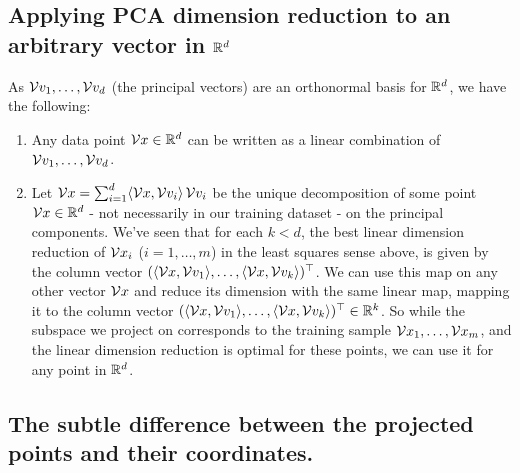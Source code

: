 \subsection{Applying PCA dimension reduction to an arbitrary vector in $\mathbb{R}^d$}
As $\mathcal{V}{v}_1,\ldots, \mathcal{V}{v}_d$  (the principal vectors) are an orthonormal basis
for $\mathbb{R}^d$, we have the following:
\begin{enumerate}
  \item Any data point $\mathcal{V}{x}\in\mathbb{R}^d$ can be written as a linear 
    combination of  $\mathcal{V}{v}_1,\ldots, \mathcal{V}{v}_d$. 
  \item Let $\mathcal{V}{x}=\sum_{i=1}^d \langle \mathcal{V}{x},\mathcal{V}{v}_i \rangle\, \mathcal{V}{v}_i$ be the unique decomposition
    of some point
    $\mathcal{V}{x}\in\mathbb{R}^d$ - not necessarily in our training 
    dataset -  on the principal components. 
    We've seen that for each $k<d$, the best linear dimension reduction of
    $\mathcal{V}{x}_i$ ($i=1,\ldots, m$) in the least squares sense above, is 
    given by the column vector $(\langle \mathcal{V}{x},\mathcal{V}{v}_1 \rangle,
    \ldots,
  \langle \mathcal{V}{x},\mathcal{V}{v}_k \rangle)^\top$. 
    We can use this map on any other vector $\mathcal{V}{x}$ and reduce its dimension
    with the same linear map, mapping it to 
    the column vector $(\langle \mathcal{V}{x},\mathcal{V}{v}_1 \rangle,\ldots,
      \langle \mathcal{V}{x},\mathcal{V}{v}_k \rangle)^\top\in\mathbb{R}^k$.
    So while the subspace we project on corresponds to the training sample 
    $\mathcal{V}{x}_1,\ldots,\mathcal{V}{x}_m$, and the linear dimension reduction is optimal for
    these points, we can use it for any point in $\mathbb{R}^d$. 

\end{enumerate}


\subsection{The subtle difference between the projected points and their
coordinates.}

